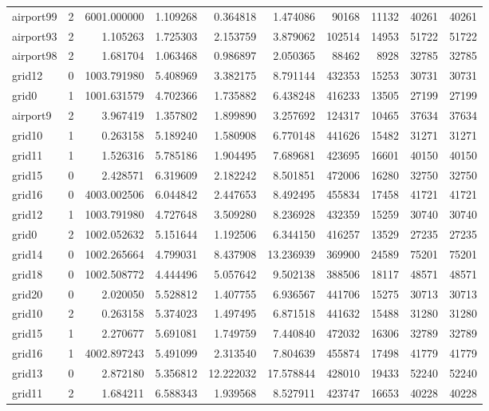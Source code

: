 \begin{longtable}{|l|r|r|r|r|r|r|r|r|r|}
airport99 & 2 & 6001.000000 & 1.109268 & 0.364818 & 1.474086 & 90168 & 11132 & 40261 & 40261 \\
airport93 & 2 & 1.105263 & 1.725303 & 2.153759 & 3.879062 & 102514 & 14953 & 51722 & 51722 \\
airport98 & 2 & 1.681704 & 1.063468 & 0.986897 & 2.050365 & 88462 & 8928 & 32785 & 32785 \\
grid12 & 0 & 1003.791980 & 5.408969 & 3.382175 & 8.791144 & 432353 & 15253 & 30731 & 30731 \\
grid0 & 1 & 1001.631579 & 4.702366 & 1.735882 & 6.438248 & 416233 & 13505 & 27199 & 27199 \\
airport9 & 2 & 3.967419 & 1.357802 & 1.899890 & 3.257692 & 124317 & 10465 & 37634 & 37634 \\
grid10 & 1 & 0.263158 & 5.189240 & 1.580908 & 6.770148 & 441626 & 15482 & 31271 & 31271 \\
grid11 & 1 & 1.526316 & 5.785186 & 1.904495 & 7.689681 & 423695 & 16601 & 40150 & 40150 \\
grid15 & 0 & 2.428571 & 6.319609 & 2.182242 & 8.501851 & 472006 & 16280 & 32750 & 32750 \\
grid16 & 0 & 4003.002506 & 6.044842 & 2.447653 & 8.492495 & 455834 & 17458 & 41721 & 41721 \\
grid12 & 1 & 1003.791980 & 4.727648 & 3.509280 & 8.236928 & 432359 & 15259 & 30740 & 30740 \\
grid0 & 2 & 1002.052632 & 5.151644 & 1.192506 & 6.344150 & 416257 & 13529 & 27235 & 27235 \\
grid14 & 0 & 1002.265664 & 4.799031 & 8.437908 & 13.236939 & 369900 & 24589 & 75201 & 75201 \\
grid18 & 0 & 1002.508772 & 4.444496 & 5.057642 & 9.502138 & 388506 & 18117 & 48571 & 48571 \\
grid20 & 0 & 2.020050 & 5.528812 & 1.407755 & 6.936567 & 441706 & 15275 & 30713 & 30713 \\
grid10 & 2 & 0.263158 & 5.374023 & 1.497495 & 6.871518 & 441632 & 15488 & 31280 & 31280 \\
grid15 & 1 & 2.270677 & 5.691081 & 1.749759 & 7.440840 & 472032 & 16306 & 32789 & 32789 \\
grid16 & 1 & 4002.897243 & 5.491099 & 2.313540 & 7.804639 & 455874 & 17498 & 41779 & 41779 \\
grid13 & 0 & 2.872180 & 5.356812 & 12.222032 & 17.578844 & 428010 & 19433 & 52240 & 52240 \\
grid11 & 2 & 1.684211 & 6.588343 & 1.939568 & 8.527911 & 423747 & 16653 & 40228 & 40228 \\

\end{longtable}
